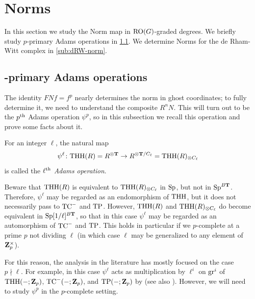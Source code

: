 
\section{Norms}
\label{sec:norms}

In this section we study the Norm map in $\operatorname{RO}(G)$-graded degrees. We briefly study $p$-primary Adams operations in \sec\ref{sub:adams}. We determine Norms for the de Rham-Witt complex in \sec\ref{sub:dRW-norm}.

\subsection{-primary Adams operations}
\label{sub:adams}

The identity $FNf = f^p$ nearly determines the norm in ghost coordinates; to fully determine it, we need to understand the composite $R^n N$. This will turn out to be the $p^{\mathrm{th}}$ Adams operation $\psi^p$, so in this subsection we recall this operation and prove some facts about it.

\begin{definition}
  For an integer $\ell$, the natural map
  \[ \psi^\ell\colon \mathrm{THH}(R) = R^{\otimes\mathbf T} \to R^{\otimes\mathbf T/C_\ell} = \mathrm{THH}(R)_{\otimes C_\ell} \]
  is called the \emph{$\ell^{\mathrm{th}}$ Adams operation}.
\end{definition}

Beware that $\mathrm{THH}(R)$ is equivalent to $\mathrm{THH}(R)_{\otimes C_\ell}$ in $\mathrm{Sp}$, but not in $\mathrm{Sp}^{B\mathbf T}$. Therefore, $\psi^\ell$ may be regarded as an endomorphism of $\mathrm{THH}$, but it does not necessarily pass to $\mathrm{TC}^-$ and $\mathrm{TP}$. However, $\mathrm{THH}(R)$ and $\mathrm{THH}(R)_{\otimes C_\ell}$ do become equivalent in $\mathrm{Sp}[1/\ell]^{B\mathbf T}$, so that in this case $\psi^\ell$ may be regarded as an automorphism of $\mathrm{TC}^-$ and $\mathrm{TP}$. This holds in particular if we $p$-complete at a prime $p$ not dividing $\ell$ (in which case $\ell$ may be generalized to any element of $\mathbf Z_p^\times$).

  For this reason, the analysis in the literature has mostly focused on the case $p\nmid\ell$. For example, in this case $\psi^\ell$ acts as multiplication by $\ell^i$ on $\operatorname{gr}^i$ of $\mathrm{THH}(-;\mathbf Z_p)$, $\mathrm{TC}^-(-;\mathbf Z_p)$, and $\mathrm{TP}(-;\mathbf Z_p)$ by \cite[Proposition 9.14]{BMS2} (see also \cite[Theorem 10.5]{ABGHLM}). However, we will need to study $\psi^p$ in the $p$-complete setting.

